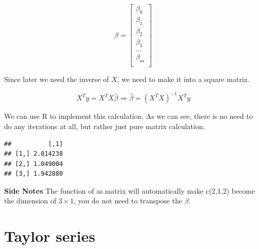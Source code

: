 \documentclass[
]{book}
\newenvironment{Shaded}{\begin{snugshade}}{\end{snugshade}}
\newcommand{\CommentTok}[1]{\textcolor[rgb]{0.56,0.35,0.01}{\textit{#1}}}
\newcommand{\DataTypeTok}[1]{\textcolor[rgb]{0.13,0.29,0.53}{#1}}
\newcommand{\DecValTok}[1]{\textcolor[rgb]{0.00,0.00,0.81}{#1}}
\newcommand{\KeywordTok}[1]{\textcolor[rgb]{0.13,0.29,0.53}{\textbf{#1}}}
\newcommand{\NormalTok}[1]{#1}
\newcommand{\OperatorTok}[1]{\textcolor[rgb]{0.81,0.36,0.00}{\textbf{#1}}}
\begin{document}
\[\beta = \begin{bmatrix}\beta_0 \\
\beta_1 \\
\beta_2 \\
\beta_3 \\
...\\
\beta_m \\
\end{bmatrix}\]

Since later we need the inverse of \(X\), we need to make it into a square matrix.

\[X^Ty=X^TX \hat{\beta} \Rightarrow \hat{\beta} = (X^TX)^{-1} X^Ty\]

We can use R to implement this calculation. As we can see, there is no need to do any iterations at all, but rather just pure matrix calculation.

\begin{Shaded}
\end{Shaded}

\begin{verbatim}
##          [,1]
## [1,] 2.014238
## [2,] 1.049004
## [3,] 1.942880
\end{verbatim}

\textbf{Side Notes}
The function of as.matrix will automatically make c(2,1,2) become the dimension of \(3 \times 1\), you do not need to transpose the \(\beta\).

\hypertarget{taylor-series}{%
\section{Taylor series}\label{taylor-series}}
\end{document}

